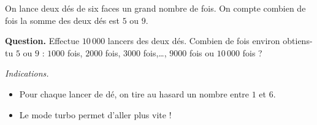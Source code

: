 \documentclass[class=report,crop=false, 12pt]{standalone}
\begin{document}


\begin{enigme}

On lance deux dés de six faces un grand nombre de fois.
On compte combien de fois la somme des deux dés est $5$ ou $9$.




\bigskip

\textbf{Question.} Effectue $10\,000$ lancers des deux dés. Combien de fois environ obtiens-tu $5$ ou $9$ :
$1000$ fois, $2000$ fois, $3000$ fois,\ldots, $9000$ fois ou $10\, 000$ fois ?

\bigskip
\emph{Indications.}
\begin{itemize}
  \item Pour chaque lancer de dé, on tire au hasard un nombre entre $1$ et $6$.
  \item Le mode turbo permet d'aller plus vite !
\end{itemize}



%

\end{enigme}
\end{document}
